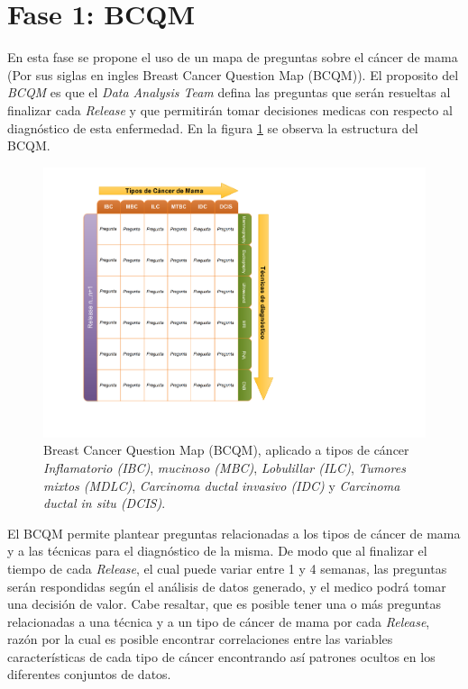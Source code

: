 \section{Fase 1: BCQM} 
En esta fase se propone el uso de un mapa de preguntas sobre el cáncer de mama (Por sus siglas en ingles Breast Cancer Question Map (BCQM)). El proposito del \textit{BCQM} es que el \textit{Data Analysis Team} defina las preguntas que serán resueltas al finalizar cada \textit{Release} y que permitirán tomar decisiones medicas con respecto al diagnóstico de esta enfermedad. En la figura \ref{BCQM} se observa la estructura del BCQM.

\begin{figure}
	\centering
	\includegraphics[width=0.8
	\linewidth]{IMAGENES/BCQM_SPANISH}
	\caption{Breast Cancer Question Map (BCQM), aplicado a tipos de cáncer \textit{Inflamatorio (IBC)}, \textit{mucinoso (MBC)}, \textit{Lobulillar (ILC)}, \textit{Tumores mixtos (MDLC)}, \textit{Carcinoma ductal invasivo (IDC)} y \textit{Carcinoma ductal in situ (DCIS)}\cite{BCQM2023}.}
	\label{BCQM}
\end{figure}

El BCQM permite plantear preguntas relacionadas a los tipos de cáncer de mama y a las técnicas para el diagnóstico de la misma. De modo que al finalizar el tiempo de cada \textit{Release}, el cual puede variar entre 1 y 4 semanas, las preguntas serán respondidas según el análisis de datos generado, y el medico podrá tomar una decisión de valor. Cabe resaltar, que es posible tener una o más preguntas relacionadas a una técnica y a un tipo de cáncer de mama por cada \textit{Release}, razón por la cual es posible encontrar correlaciones entre las variables características de cada tipo de cáncer encontrando así patrones ocultos en los diferentes conjuntos de datos.

